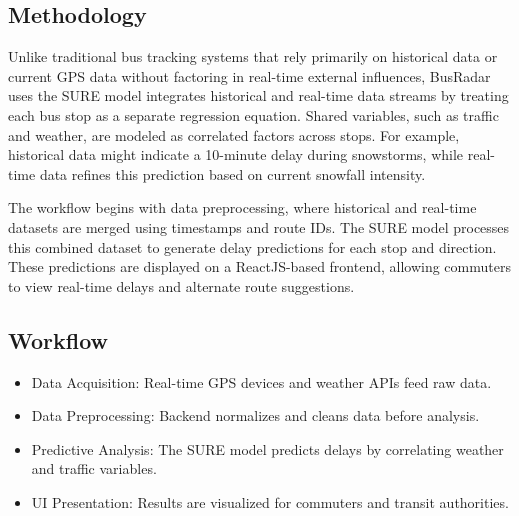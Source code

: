 \documentclass[conference]{IEEEtran}
\begin{document}
\subsection{Methodology }
Unlike traditional bus tracking systems that rely primarily on historical data or current GPS data without factoring in real-time external influences, BusRadar uses the SURE model integrates historical and real-time data streams by treating each bus stop as a separate regression equation. Shared variables, such as traffic and weather, are modeled as correlated factors across stops. For example, historical data might indicate a 10-minute delay during snowstorms, while real-time data refines this prediction based on current snowfall intensity. 

The workflow begins with data preprocessing, where historical and real-time datasets are merged using timestamps and route IDs. The SURE model processes this combined dataset to generate delay predictions for each stop and direction. These predictions are displayed on a ReactJS-based frontend, allowing commuters to view real-time delays and alternate route suggestions. 

\subsection{Workflow}
\begin{itemize}
    \item Data Acquisition: Real-time GPS devices and weather APIs feed raw data.
    \item Data Preprocessing: Backend normalizes and cleans data before analysis.
    \item Predictive Analysis: The SURE model predicts delays by correlating weather and traffic variables.
    \item UI Presentation: Results are visualized for commuters and transit authorities.
\end{itemize}
\end{document}
